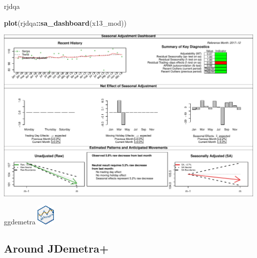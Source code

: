 \documentclass[10pt,xcolor=table,color={dvipsnames,usenames},ignorenonframetext,usepdftitle=false,french]{beamer}
\newenvironment{Shaded}{\begin{snugshade}}{\end{snugshade}}
\newcommand{\KeywordTok}[1]{\textcolor[rgb]{0.13,0.29,0.53}{\textbf{#1}}}
\newcommand{\NormalTok}[1]{#1}
\newcommand{\OperatorTok}[1]{\textcolor[rgb]{0.81,0.36,0.00}{\textbf{#1}}}
\begin{document}
\begin{frame}[fragile]{rjdqa}
\protect\hypertarget{rjdqa}{}

\footnotesize

\begin{Shaded}
\begin{Highlighting}[]
\KeywordTok{plot}\NormalTok{(rjdqa}\OperatorTok{::}\KeywordTok{sa_dashboard}\NormalTok{(x13_mod))}
\end{Highlighting}
\end{Shaded}

\includegraphics{img/markdown-unnamed-chunk-17-1.pdf}

\end{frame}

\begin{frame}{ggdemetra
\includegraphics[height=1cm]{img/ggdemetra_logo.png}}
\protect\hypertarget{ggdemetra}{}


\end{frame}

\hypertarget{around-jdemetra}{%
\subsection{Around JDemetra+}\label{around-jdemetra}}
\end{document}
